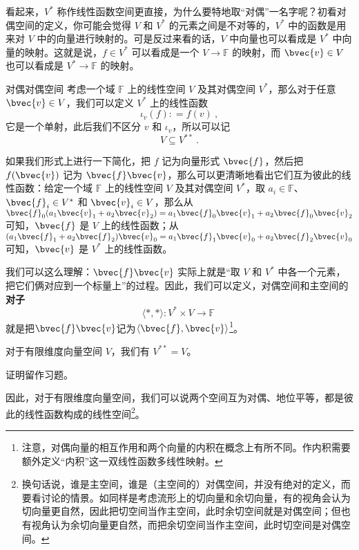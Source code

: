 看起来，$V^*$ 称作线性函数空间更直接，为什么要特地取“对偶”一名字呢？初看对偶空间的定义，你可能会觉得 $V$ 和 $V^*$ 的元素之间是不对等的，$V^*$ 中的函数是用来对 $V$ 中的向量进行映射的。可是反过来看的话，$V$ 中向量也可以看成是 $V^*$ 中向量的映射。这就是说，$f\in V^*$ 可以看成是一个 $V\rightarrow\mathbb{F}$ 的映射，而 $\bvec{v}\in V$ 也可以看成是 $V^*\rightarrow\mathbb{F}$ 的映射。

\begin{theorem}{对偶对偶空间}\label{the_DualSp_3}
考虑一个域 $\mathbb{F}$ 上的线性空间 $V$ 及其对偶空间 $V^*$，那么对于任意 $\bvec{v} \in V$，我们可以定义 $V^*$ 上的线性函数
\begin{equation}
\iota_v(f): = f(v)~,
\end{equation}
它是一个单射，此后我们不区分 $v$ 和 $\iota_v$，所以可以记
\begin{equation}
V \subseteq V^{**}~.
\end{equation}
\end{theorem}

如果我们形式上进行一下简化，把 $f$ 记为向量形式 $\bvec{f}$，然后把 $f(\bvec{v})$ 记为 $\bvec{f}\bvec{v}$，那么可以更清晰地看出它们互为彼此的线性函数：给定一个域 $\mathbb{F}$ 上的线性空间 $V$ 及其对偶空间 $V^*$，取 $a_i\in\mathbb{F}$、$\bvec{f}_i\in V^*$ 和 $\bvec{v}_i\in V$，那么从 $\bvec{f}_0(a_1\bvec{v}_1+a_2\bvec{v}_2)=a_1\bvec{f}_0\bvec{v}_1+a_2\bvec{f}_0\bvec{v}_2$ 可知，$\bvec{f}$ 是 $V$ 上的线性函数；从 $(a_1\bvec{f}_1+a_2\bvec{f}_2)\bvec{v}_0=a_1\bvec{f}_1\bvec{v}_0+a_2\bvec{f}_2\bvec{v}_0$ 可知，$\bvec{v}$ 是 $V^*$ 上的线性函数。

我们可以这么理解：$\bvec{f}\bvec{v}$ 实际上就是“取 $V$ 和 $V^*$ 中各一个元素，把它们俩对应到一个标量上”的过程。因此，我们可以定义，对偶空间和主空间的\textbf{对子}
\begin{equation}
\langle *, * \rangle: V^* \times V \to \mathbb{F}~
\end{equation}
就是把$\bvec{f}\bvec{v}$记为$\langle \bvec{f}, \bvec{v} \rangle$\footnote{注意，对偶向量的相互作用和两个向量的内积在概念上有所不同。作内积需要额外定义“内积”这一双线性函数多线性映射。}。

\begin{theorem}{}\label{the_DualSp_4}
对于有限维度向量空间 $V$，我们有 $V^{**} = V$。
\end{theorem}
证明留作习题。

因此，对于有限维度向量空间，我们可以说两个空间互为对偶、地位平等，都是彼此的线性函数构成的线性空间\footnote{换句话说，谁是主空间，谁是（主空间的）对偶空间，并没有绝对的定义，而要看讨论的情景。如同样是考虑流形上的切向量和余切向量，有的视角会认为切向量更自然，因此把切空间当作主空间，此时余切空间就是对偶空间；但也有视角认为余切向量更自然，而把余切空间当作主空间，此时切空间是对偶空间。}。


